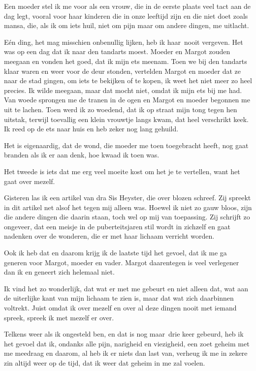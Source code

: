\documentclass{book}
\begin{document}
Een moeder stel ik me voor als een vrouw, die in de eerste plaats veel
tact aan de dag legt, vooral voor haar kinderen die in onze leeftijd
zijn en die niet doet zoals mansa, die, als ik om iets huil, niet om
pijn maar om andere dingen, me uitlacht.

Eén ding, het mag misschien onbenullig lijken, heb ik haar~nooit
vergeven. Het was op een dag dat ik naar den tandarts moest. Moeder en
Margot zouden meegaan en vonden het goed, dat ik mijn ets meenam. Toen
we bij den tandarts klaar waren en weer voor de deur stonden, vertelden
Margot en moeder dat ze naar de stad gingen, om iets te bekijken of te
kopen, ik weet het niet meer zo heel precies. Ik wilde meegaan, maar dat
mocht niet, omdat ik mijn ets bij me had. Van woede sprongen me de
tranen in de ogen en Margot en moeder begonnen me uit te lachen. Toen
werd ik zo woedend, dat ik op straat mijn tong tegen hen uitstak,
terwijl toevallig een klein vrouwtje langs kwam, dat heel verschrikt
keek. Ik reed op de ets naar huis en heb zeker nog lang gehuild.

Het is eigenaardig, dat de wond, die moeder me toen toegebracht heeft,
nog gaat branden als ik er aan denk, hoe kwaad ik toen was.

Het tweede is iets dat me erg veel moeite kost om het je te vertellen,
want het gaat over mezelf.

Gisteren las ik een artikel van dra Sis Heyster, die over blozen
schreef. Zij spreekt in dit artikel net alsof het tegen mij alleen was.
Hoewel ik niet zo gauw bloos, zijn die andere dingen die daarin staan,
toch wel op mij van toepassing. Zij schrijft zo ongeveer, dat een meisje
in de puberteitsjaren stil wordt in zichzelf en gaat nadenken over de
wonderen, die er met haar lichaam verricht worden.

Ook ik heb dat en daarom krijg ik de laatste tijd het gevoel, dat ik me
ga generen voor Margot, moeder en vader. Margot daarentegen is veel
verlegener dan ik en geneert zich helemaal niet.

Ik vind het zo wonderlijk, dat wat er met me gebeurt en niet alleen dat,
wat aan de uiterlijke kant van mijn lichaam te zien is, maar dat wat
zich daarbinnen voltrekt. Juist omdat ik over mezelf en over al deze
dingen nooit met iemand spreek, spreek ik met mezelf er over.

Telkens weer als ik ongesteld ben, en dat is nog maar~drie keer gebeurd,
heb ik het gevoel dat ik, ondanks alle pijn, narigheid en viezigheid,
een zoet geheim met me meedraag en daarom, al heb ik er niets dan last
van, verheug ik me in zekere zin altijd weer op de tijd, dat ik weer dat
geheim in me zal voelen.
\end{document}
